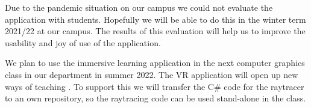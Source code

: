 \documentclass{VRARWorkshop}
\begin{document}
Due to the pandemic situation on our campus we could not evaluate the application with students.
Hopefully we will be able to do this in the winter term 2021/22 at our campus.
The results of this evaluation will help us to improve the usability and joy of use of the application.

We plan to use the immersive learning application in the next computer graphics class in our department
in summer 2022. The VR application will open up new ways of teaching \cite{ganovelli_08, vitsas_20}.
To support this we will transfer the C\# code for the raytracer to an own repository, so the raytracing code
can be used stand-alone in the class.

\VRARsetbibstyle

\end{document}
